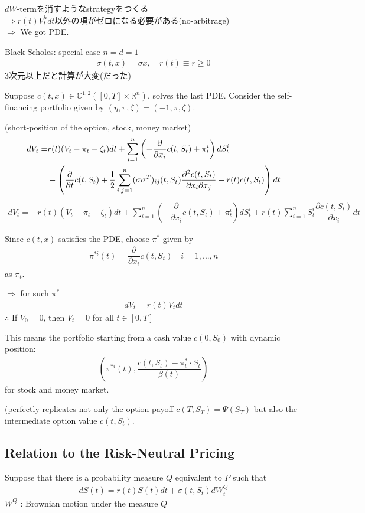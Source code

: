 \documentclass[a4paper,11pt]{jsarticle}
\theoremstyle{definition}
\newcommand{\pd}[2]{\dfrac{\partial #1}{\partial #2}}
\newcommand{\df}[2]{\dfrac{#1}{#2}}
\begin{document}
$dW$-termを消すようなstrategyをつくる \\
$\Rightarrow r(t)V_t^h dt$以外の項がゼロになる必要がある(no-arbitrage)\\
$\Rightarrow$ We got PDE.

Black-Scholes: special case $n=d=1$
\begin{align}
  \sigma(t,x)=\sigma x, \quad r(t) \equiv r\geq 0
\end{align}
3次元以上だと計算が大変(だった)

Suppose $c(t,x) \in \mathbb{C}^{1,2}([0,T]\times\mathbb{R}^n)$,
solves the last PDE.
Consider the self-financing portfolio given by
$(\eta, \pi, \zeta)=(-1,\pi,\zeta)$.

(short-position of the option, stock, money market)
\begin{align}
  dV_t=&r(t)(V_t-\pi_t-\zeta_t)dt+\sum_{i=1}^n
  \left(-\pd{}{x_i}c(t,S_t)+\pi_t^i \right)dS_t^i \notag\\
  &-\left(\pd{}{t}c(t,S_t)+\df{1}{2}\sum_{i,j=1}^n
  (\sigma \sigma^T)_{ij}(t,S_t)
  \df{\partial^2 c(t,S_t)}{\partial x_i \partial x_j}
  -r(t)c(t,S_t)\right)dt
\end{align}
\begin{align}
  dV_t=&r(t)(V_t-\pi_t-\zeta_t)dt+\sum_{i=1}^n
  \left(-\pd{}{x_i}c(t,S_t)+\pi_t^i \right)dS_t^i
  +r(t)\sum_{i=1}^n S_t^i \pd{c(t,S_t)}{x_i} dt
\end{align}

Since $c(t,x)$ satisfies the PDE,
choose $\pi^*$ given by
\begin{align}
  \pi^{* i}(t)=\pd{}{x_i}c(t,S_t) \quad i=1,...,n
\end{align}
as $\pi_t$.

$\Rightarrow$ for such $\pi^*$
\begin{align}
  dV_t=r(t)V_t dt
\end{align}
$\therefore$ If $V_0=0$, then $V_t=0$ for all $t\in[0,T]$

This means the portfolio starting from a cash value
$c(0,S_0)$ with dynamic position:
\begin{align}
  \left( \pi^{* i}(t),
  \df{c(t,S_t)-\pi_t^{*}\cdot S_t}{\beta(t)} \right)
\end{align}
for stock and money market.

(perfectly replicates not only the option payoff
$c(T,S_T)=\Psi(S_T)$ but also the intermediate
option value $c(t,S_t)$.

\subsection{Relation to the Risk-Neutral Pricing}
Suppose that there is a probability measure $Q$
equivalent to $P$ such that
\begin{align}
  dS(t)=r(t)S(t)dt+\sigma(t,S_t)dW_t^Q
\end{align}
$W^Q$ : Brownian motion under the measure $Q$
\end{document}

